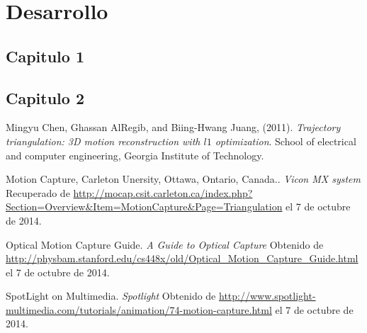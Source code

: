 \documentclass[11pt,letterpaper]{article}     %
\begin{document}
\section{Desarrollo}
\subsection{Capitulo 1}

\subsection{Capitulo 2}


\newpage
\renewcommand{\bibname}{Referencias}

\begin{thebibliography}{5}
 Mingyu Chen, Ghassan AlRegib, and Biing-Hwang Juang, (2011). \textit{Trajectory triangulation: 3D motion reconstruction with $l1$ optimization}. School of electrical and computer engineering, Georgia Institute of Technology.


 Motion Capture, Carleton Unersity, Ottawa, Ontario, Canada..  \textit{Vicon MX system} Recuperado de \url{http://mocap.csit.carleton.ca/index.php?Section=Overview&Item=MotionCapture&Page=Triangulation} el 7 de octubre de 2014.

 Optical Motion Capture Guide. \textit{A Guide to Optical Capture} Obtenido de \url{http://physbam.stanford.edu/cs448x/old/Optical_Motion_Capture_Guide.html}  el 7 de octubre de 2014.


 SpotLight on Multimedia. \textit{Spotlight} Obtenido de \url{http://www.spotlight-multimedia.com/tutorials/animation/74-motion-capture.html}  el 7 de octubre de 2014.



\end{thebibliography} 
\end{document}
